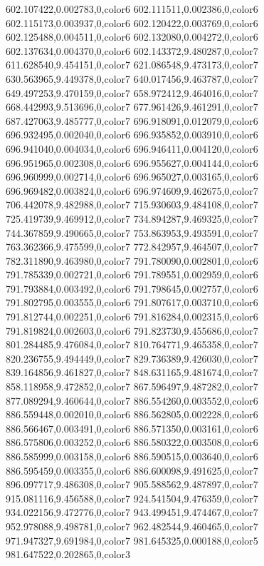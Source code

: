 602.107422,0.002783,0,color6
602.111511,0.002386,0,color6
602.115173,0.003937,0,color6
602.120422,0.003769,0,color6
602.125488,0.004511,0,color6
602.132080,0.004272,0,color6
602.137634,0.004370,0,color6
602.143372,9.480287,0,color7
611.628540,9.454151,0,color7
621.086548,9.473173,0,color7
630.563965,9.449378,0,color7
640.017456,9.463787,0,color7
649.497253,9.470159,0,color7
658.972412,9.464016,0,color7
668.442993,9.513696,0,color7
677.961426,9.461291,0,color7
687.427063,9.485777,0,color7
696.918091,0.012079,0,color6
696.932495,0.002040,0,color6
696.935852,0.003910,0,color6
696.941040,0.004034,0,color6
696.946411,0.004120,0,color6
696.951965,0.002308,0,color6
696.955627,0.004144,0,color6
696.960999,0.002714,0,color6
696.965027,0.003165,0,color6
696.969482,0.003824,0,color6
696.974609,9.462675,0,color7
706.442078,9.482988,0,color7
715.930603,9.484108,0,color7
725.419739,9.469912,0,color7
734.894287,9.469325,0,color7
744.367859,9.490665,0,color7
753.863953,9.493591,0,color7
763.362366,9.475599,0,color7
772.842957,9.464507,0,color7
782.311890,9.463980,0,color7
791.780090,0.002801,0,color6
791.785339,0.002721,0,color6
791.789551,0.002959,0,color6
791.793884,0.003492,0,color6
791.798645,0.002757,0,color6
791.802795,0.003555,0,color6
791.807617,0.003710,0,color6
791.812744,0.002251,0,color6
791.816284,0.002315,0,color6
791.819824,0.002603,0,color6
791.823730,9.455686,0,color7
801.284485,9.476084,0,color7
810.764771,9.465358,0,color7
820.236755,9.494449,0,color7
829.736389,9.426030,0,color7
839.164856,9.461827,0,color7
848.631165,9.481674,0,color7
858.118958,9.472852,0,color7
867.596497,9.487282,0,color7
877.089294,9.460644,0,color7
886.554260,0.003552,0,color6
886.559448,0.002010,0,color6
886.562805,0.002228,0,color6
886.566467,0.003491,0,color6
886.571350,0.003161,0,color6
886.575806,0.003252,0,color6
886.580322,0.003508,0,color6
886.585999,0.003158,0,color6
886.590515,0.003640,0,color6
886.595459,0.003355,0,color6
886.600098,9.491625,0,color7
896.097717,9.486308,0,color7
905.588562,9.487897,0,color7
915.081116,9.456588,0,color7
924.541504,9.476359,0,color7
934.022156,9.472776,0,color7
943.499451,9.474467,0,color7
952.978088,9.498781,0,color7
962.482544,9.460465,0,color7
971.947327,9.691984,0,color7
981.645325,0.000188,0,color5
981.647522,0.202865,0,color3
